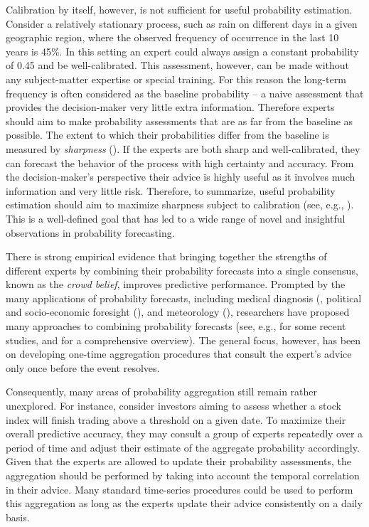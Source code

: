 \documentclass[aoas, preprint]{imsart}
\numberwithin{equation}{section}
\theoremstyle{plain}
\begin{document}
Calibration by itself, however, is not sufficient for useful probability estimation. Consider a relatively stationary process, such as rain on different days in a given geographic region, where the observed frequency of occurrence in the last 10 years is 45\%. In this setting an expert could always  assign a constant probability of 0.45 and be well-calibrated. This assessment, however, can be made without any subject-matter expertise or special training. For this reason the long-term frequency is often considered as the baseline probability -- a naive assessment that provides the decision-maker very little extra information. Therefore experts should aim to make probability assessments that are as far from the baseline as possible. The extent to which their probabilities differ from the baseline is measured by \textit{sharpness} (\citet{gneiting2008rejoinder, winkler2008comments}). If the experts are both sharp and well-calibrated, they can forecast the behavior of the process with high certainty and accuracy. From the decision-maker's perspective their advice is highly useful as it involves much information and very little risk. Therefore, to summarize, useful probability estimation should aim to maximize sharpness subject to calibration (see, e.g., \citet{raftery2005using, murphy1987general}). This is a well-defined goal that has led to a wide range of novel and insightful observations in probability forecasting. 

There is strong empirical evidence that bringing together the strengths of different experts by combining their probability forecasts into a single consensus, known as the \textit{crowd belief},  improves predictive performance. Prompted by the many applications of probability forecasts, including medical diagnosis (\citet{wilson1998prediction, pepe2003statistical}, political and socio-economic foresight (\citet{tetlock2005expert}), and meteorology (\citet{sanders1963subjective, vislocky1995improved, baars2005performance}), researchers have proposed many approaches to combining probability forecasts (see, e.g., \citet{Ranjan08, satopaa} for some recent studies, and \citet{Genest, Wallsten97evaluatingand, clemen2007aggregating, primo2009calibration} for a comprehensive overview). The general focus, however, has been on developing one-time aggregation procedures that consult the expert's advice only once before the event resolves. 

Consequently, many areas of probability aggregation still remain rather unexplored. For instance, consider investors aiming to assess whether a stock index will finish trading above a threshold on a given date. To maximize their overall predictive accuracy, they may consult a group of experts repeatedly over a period of time and adjust their estimate of the aggregate probability accordingly. Given that the experts are allowed to update their probability assessments, the aggregation should be performed by taking into account the temporal correlation in their advice. Many standard time-series procedures could be used to perform this aggregation as long as the experts update their advice consistently on a daily basis. 
\end{document}
